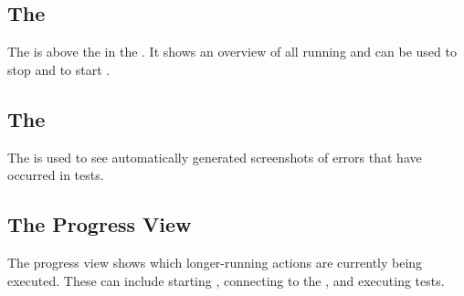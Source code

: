 \subsection{The \gdrunautview{}}
The \gdrunautview{} is above the \gdtestsuitebrowser{} in the \specpersp{}. It shows an overview of all running \gdauts{} and can be used to stop \gdauts{} and to start \gdsuites{}.  

\subsection{The \gdimgview{}}
The \gdimgview{} is used to see automatically generated screenshots of errors that have occurred in tests.

\subsection{The Progress View}
The progress view shows which longer-running actions are currently being executed. These can include starting \gdauts{}, connecting to the \gdagent{}, and executing tests.
